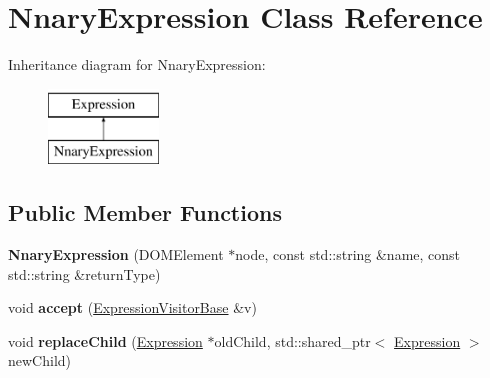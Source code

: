 \hypertarget{class_nnary_expression}{\section{Nnary\+Expression Class Reference}
\label{class_nnary_expression}
}
Inheritance diagram for Nnary\+Expression\+:\begin{figure}[H]
\begin{center}
\leavevmode
\includegraphics[height=2.000000cm]{class_nnary_expression}
\end{center}
\end{figure}
\subsection*{Public Member Functions}
\begin{DoxyCompactItemize}
\item 
\hypertarget{class_nnary_expression_a38f44966213fd5d674aaff3ef9de37da}{{\bfseries Nnary\+Expression} (D\+O\+M\+Element $\ast$node, const std\+::string \&name, const std\+::string \&return\+Type)}\label{class_nnary_expression_a38f44966213fd5d674aaff3ef9de37da}

\item 
\hypertarget{class_nnary_expression_a5934f3925e13888b3241f6b269d5ee44}{void {\bfseries accept} (\hyperlink{class_expression_visitor_base}{Expression\+Visitor\+Base} \&v)}\label{class_nnary_expression_a5934f3925e13888b3241f6b269d5ee44}

\item 
\hypertarget{class_nnary_expression_a1161a6f8776c4cc946d769e4526339a2}{void {\bfseries replace\+Child} (\hyperlink{class_expression}{Expression} $\ast$old\+Child, std\+::shared\+\_\+ptr$<$ \hyperlink{class_expression}{Expression} $>$ new\+Child)}\label{class_nnary_expression_a1161a6f8776c4cc946d769e4526339a2}

\end{DoxyCompactItemize}
